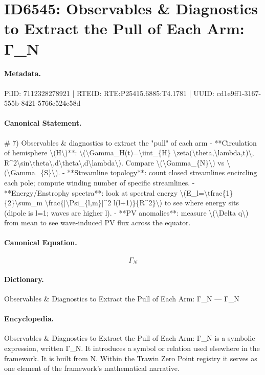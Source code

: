\section*{ID6545: Observables \& Diagnostics to Extract the Pull of Each Arm: Γ\_N}
\paragraph{Metadata.}
PiID: 7112328278921 | RTEID: RTE:P25415.6885:T4.1781 | UUID: cd1e9ff1-3167-555b-8421-5766c524c58d

\paragraph{Canonical Statement.}
\# 7) Observables \& diagnostics to extract the "pull" of each arm - **Circulation of hemisphere \textbackslash{}(H\textbackslash{})**: \textbackslash{}(\textbackslash{}Gamma\_H(t)=\textbackslash{}iint\_\{H\} \textbackslash{}zeta(\textbackslash{}theta,\textbackslash{}lambda,t)\textbackslash{}, R\textasciicircum{}2\textbackslash{}sin\textbackslash{}theta\textbackslash{},d\textbackslash{}theta\textbackslash{},d\textbackslash{}lambda\textbackslash{}). Compare \textbackslash{}(\textbackslash{}Gamma\_\{N\}\textbackslash{}) vs \textbackslash{}(\textbackslash{}Gamma\_\{S\}\textbackslash{}). - **Streamline topology**: count closed streamlines encircling each pole; compute winding number of specific streamlines. - **Energy/Enstrophy spectra**: look at spectral energy \textbackslash{}(E\_l=\textbackslash{}tfrac\{1\}\{2\}\textbackslash{}sum\_m \textbackslash{}frac\{|\textbackslash{}Psi\_\{l,m\}|\textasciicircum{}2 l(l+1)\}\{R\textasciicircum{}2\}\textbackslash{}) to see where energy sits (dipole is l=1; waves are higher l). - **PV anomalies**: measure \textbackslash{}(\textbackslash{}Delta q\textbackslash{}) from mean to see wave-induced PV flux across the equator.

\paragraph{Canonical Equation.}
\[
\Gamma_{N}
\]

\paragraph{Dictionary.}
Observables \& Diagnostics to Extract the Pull of Each Arm: Γ\_N — Γ\_N

\paragraph{Encyclopedia.}
Observables \& Diagnostics to Extract the Pull of Each Arm: Γ\_N is a symbolic expression, written Γ\_N. It introduces a symbol or relation used elsewhere in the framework. It is built from N. Within the Trawin Zero Point registry it serves as one element of the framework's mathematical narrative.
